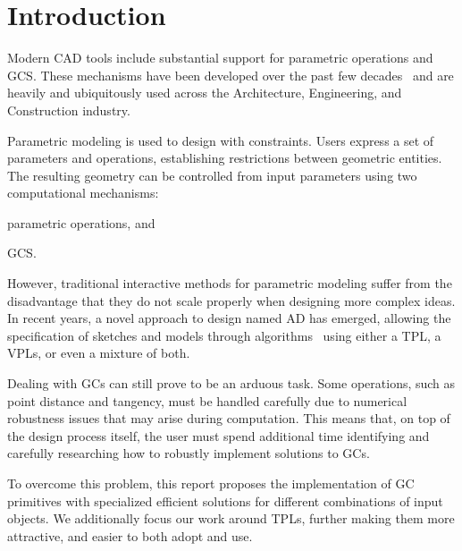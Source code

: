 \section{Introduction}%
\label{sec:intro}

Modern \ac{CAD} tools include substantial support for parametric operations and
\ac{GCS}.  These mechanisms have been developed over the past few
decades~\cite{Bettig:2011:GCSPC} and are heavily and ubiquitously used across
the Architecture, Engineering, and Construction industry.

Parametric modeling is used to design with constraints.  Users express a set of
parameters and operations, establishing restrictions between geometric entities.
The resulting geometry can be controlled from input parameters using two
computational mechanisms:
\begin{enumerate*}[label= (\arabic*)]
  \item parametric operations, and
  \item \ac{GCS}.
\end{enumerate*}

However, traditional interactive methods for parametric modeling suffer from the
disadvantage that they do not scale properly when designing more complex ideas.
In recent years, a novel approach to design named \ac{AD} has emerged, allowing
the specification of sketches and models through
algorithms~\cite{McCormack:2004:GDPDR} using either a \ac{TPL}, a \acp{VPL}, or
even a mixture of both.

Dealing with \acp{GC} can still prove to be an arduous task.  Some operations,
such as point distance and tangency, must be handled carefully due to numerical
robustness issues that may arise during computation.  This means that, on top of
the design process itself, the user must spend additional time identifying and
carefully researching how to robustly implement solutions to \acp{GC}.

To overcome this problem, this report proposes the implementation of \ac{GC}
primitives with specialized efficient solutions for different combinations of
input objects.  We additionally focus our work around \acp{TPL}, further making
them more attractive, and easier to both adopt and use.





